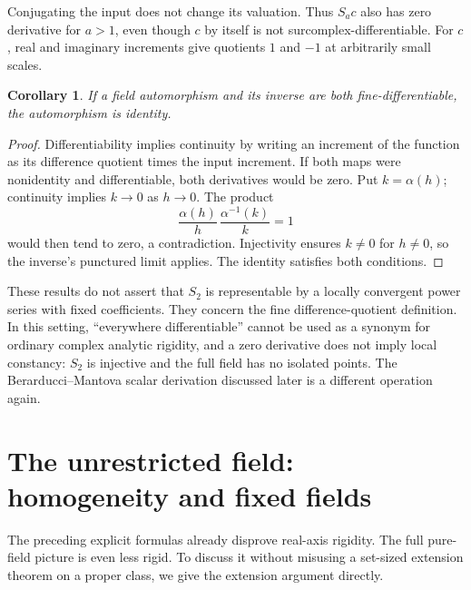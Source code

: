 \documentclass[11pt]{article}
\newtheorem{corollary}[theorem]{Corollary}
\theoremstyle{definition}
\theoremstyle{remark}
\numberwithin{equation}{section}
\begin{document}
Conjugating the input does not change its valuation. Thus $S_a c$ also
has zero derivative for $a>1$, even though $c$ by itself is not
surcomplex-differentiable. For $c$, real and imaginary increments give
quotients $1$ and $-1$ at arbitrarily small scales.

\begin{corollary}\label{saut:cor:bidifferentiable}
If a field automorphism and its inverse are both fine-differentiable, the
automorphism is identity.
\end{corollary}
\begin{proof}
Differentiability implies continuity by writing an increment of the
function as its difference quotient times the input increment. If both
maps were nonidentity and differentiable, both derivatives would be zero.
Put $k=\alpha(h)$; continuity implies $k\to0$ as $h\to0$. The product
\[
 \frac{\alpha(h)}h\,
 \frac{\alpha^{-1}(k)}k=1
\]
would then tend to zero, a contradiction. Injectivity ensures $k\ne0$
for $h\ne0$, so the inverse's punctured limit applies. The identity satisfies both
conditions.
\end{proof}

These results do not assert that $S_2$ is representable by a locally
convergent power series with fixed coefficients. They concern the fine
difference-quotient definition. In this setting, ``everywhere
differentiable'' cannot be used as a synonym for ordinary complex analytic
rigidity, and a zero derivative does not imply local constancy: $S_2$ is
injective and the full field has no isolated points. The
Berarducci--Mantova scalar derivation discussed later is a different
operation again.

\section{The unrestricted field: homogeneity and fixed fields}\label{saut:sec:bare}

The preceding explicit formulas already disprove real-axis rigidity.
The full pure-field picture is even less rigid. To discuss it without
misusing a set-sized extension theorem on a proper class, we give the
extension argument directly.
\end{document}
